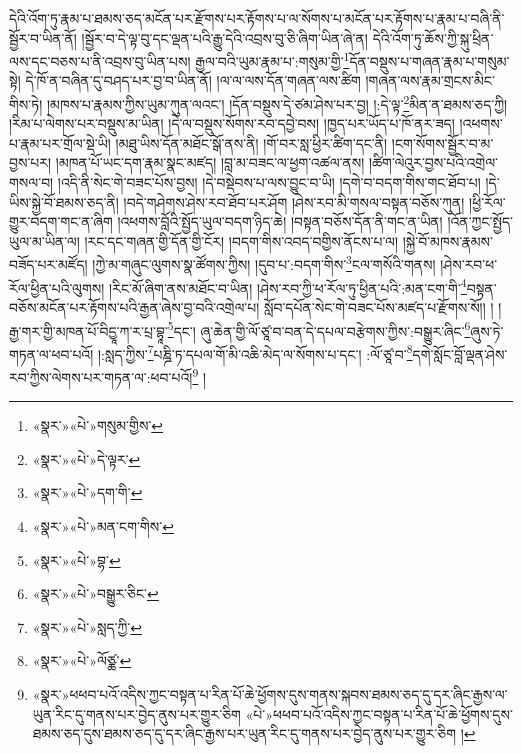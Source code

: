 དེའི་འོག་ཏུ་རྣམ་པ་ཐམས་ཅད་མངོན་པར་རྫོགས་པར་རྟོགས་པ་ལ་སོགས་པ་མངོན་པར་རྟོགས་པ་རྣམ་པ་བཞི་ནི་སྦྱོར་བ་ཡིན་ནོ། །སྦྱོར་བ་དེ་ལྟ་བུ་དང་ལྡན་པའི་རྒྱུ་དེའི་འབྲས་བུ་ཅི་ཞིག་ཡིན་ཞེ་ན། དེའི་འོག་ཏུ་ཆོས་ཀྱི་སྐུ་ཕྲིན་ལས་དང་བཅས་པ་ནི་འབྲས་བུ་ཡིན་པས། རྒྱལ་བའི་ཡུམ་རྣམ་པ་:གསུམ་གྱི་\footnote{«སྣར་»«པེ་»གསུམ་གྱིས་}དོན་བསྡུས་པ་གཞན་རྣམ་པ་གསུམ་སྟེ། དེ་ཁོ་ན་བཞིན་དུ་བཤད་པར་བྱ་བ་ཡིན་ནོ། །ལ་ལ་ལས་དོན་གཞན་ལས་ཚིག །གཞན་ལས་རྣམ་གྲངས་མིང་གིས་ཏེ། །མཁས་པ་རྣམས་ཀྱིས་ཡུམ་ཀུན་ལའང་། །དོན་བསྡུས་དེ་ཙམ་ཤེས་པར་བྱ། །:དེ་ལྟ་\footnote{«སྣར་»«པེ་»དེ་ལྟར་}མིན་ན་ཐམས་ཅད་ཀྱི། །རིམ་པ་ལེགས་པར་བསྡུས་མ་ཡིན། །དེ་ལ་བསྡུས་སོགས་རབ་དབྱེ་བས། །ཁྱད་པར་ཡོད་པ་ཁོ་ནར་ཟད། །འཕགས་པ་རྣམ་པར་གྲོལ་སྡེ་ཡི། །མཐུ་ཡིས་དོན་མཐོང་སྒོ་ནས་ནི། །གོ་བར་སླ་ཕྱིར་ཚིག་དང་ནི། །ངག་སོགས་སྦྱོར་བ་མ་བྱས་པར། །མཁན་པོ་ཡང་དག་རྣམ་སྣང་མཛད། །བླ་མ་བཟང་ལ་ཕྱག་འཚལ་ནས། །ཚིག་ལེའུར་བྱས་པའི་འགྲེལ་གསལ་བ། །འདི་ནི་སེང་གེ་བཟང་པོས་བྱས། །དེ་བསྡེབས་པ་ལས་བྱུང་བ་ཡི། །དགེ་བ་བདག་གིས་གང་ཐོབ་པ། །དེ་ཡིས་སྐྱེ་བོ་ཐམས་ཅད་ནི། །བདེ་གཤེགས་ཤེས་རབ་ཐོབ་པར་ཤོག །ཤེས་རབ་མི་གསལ་བསྟན་བཅོས་ཀུན། །ཕྱི་རོལ་གྱུར་བདག་གང་ན་ཞིག །འཕགས་བློའི་སྤྱོད་ཡུལ་བདག་ཉིད་ཆེ། །བསྟན་བཅོས་དོན་ནི་གང་ན་ཡིན། །འོན་ཀྱང་སྤྱོད་ཡུལ་མ་ཡིན་ལ། །རང་དང་གཞན་གྱི་དོན་གྱི་ངོར། །བདག་གིས་འབད་བགྱིས་ནོངས་པ་ལ། །སྐྱེ་བོ་མཁས་རྣམས་བཟོད་པར་མཛོད། །ཀྱེ་མ་གཞུང་ལུགས་སྣ་ཚོགས་ཀྱིས། །དུབ་པ་:བདག་གིས་\footnote{«སྣར་»«པེ་»དག་གི་}ངལ་གསོའི་གནས། །ཤེས་རབ་ཕ་རོལ་ཕྱིན་པའི་ལུགས། །རིང་མོ་ཞིག་ནས་མཐོང་བ་ཡིན། །ཤེས་རབ་ཀྱི་ཕ་རོལ་ཏུ་ཕྱིན་པའི་:མན་ངག་གི་\footnote{«སྣར་»«པེ་»མན་ངག་གིས་}བསྟན་བཅོས་མངོན་པར་རྟོགས་པའི་རྒྱན་ཞེས་བྱ་བའི་འགྲེལ་པ། སློབ་དཔོན་སེང་གེ་བཟང་པོས་མཛད་པ་རྫོགས་སོ།། །
།རྒྱ་གར་གྱི་མཁན་པོ་བིདྱཱ་ཀ་ར་པྲ་བྷཱ་\footnote{«སྣར་»«པེ་»བྷ་}དང་། ཞུ་ཆེན་གྱི་ལོ་ཙཱ་བ་བན་དེ་དཔལ་བརྩེགས་ཀྱིས་:བསྒྱུར་ཞིང་\footnote{«སྣར་»«པེ་»བསྒྱུར་ཅིང་}ཞུས་ཏེ་གཏན་ལ་ཕབ་པའོ། །:སླད་ཀྱིས་\footnote{«སྣར་»«པེ་»སླད་ཀྱི་}པཎྜི་ཏ་དཔལ་གོ་མི་འཆི་མེད་ལ་སོགས་པ་དང་། :ལོ་ཙཱ་བ་\footnote{«སྣར་»«པེ་»ལོཙྪ་}དགེ་སློང་བློ་ལྡན་ཤེས་རབ་ཀྱིས་ལེགས་པར་གཏན་ལ་:ཕབ་པའོ།\footnote{«སྣར་»ཕཕབ་པའོ་འདིས་ཀྱང་བསྟན་པ་རིན་པོ་ཆེ་ཕྱོགས་དུས་གནས་སྐབས་ཐམས་ཅད་དུ་དར་ཞིང་རྒྱས་ལ་ཡུན་རིང་དུ་གནས་པར་བྱེད་ནུས་པར་གྱུར་ཅིག «པེ་»ཕཕབ་པའོ་འདིས་ཀྱང་བསྟན་པ་རིན་པོ་ཆེ་ཕྱོགས་དུས་ཐམས་ཅད་དུས་ཐམས་ཅད་དུ་དར་ཞིང་རྒྱས་པར་ཡུན་རིང་དུ་གནས་པར་བྱེད་ནུས་པར་གྱུར་ཅིག །} །
